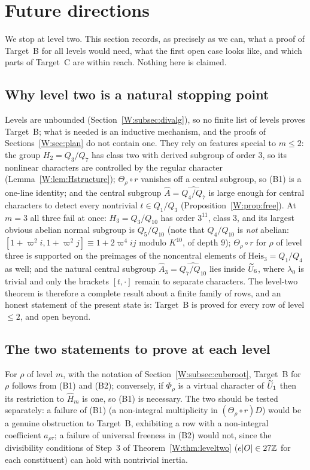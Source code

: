 \section{Future directions}\label{W:sec:future}
We stop at level two.  This section records, as precisely as we can,
what a proof of Target~B for all levels would need, what the first open
case looks like, and which parts of Target~C are within reach.  Nothing
here is claimed.

\subsection{Why level two is a natural stopping point}
Levels are unbounded (Section~\ref{W:subsec:divalg}), so no finite list of
levels proves Target~B; what is needed is an inductive mechanism, and the
proofs of Sections~\ref{W:sec:plan} do not contain one.  They rely on
features special to $m\le2$: the group $H_2=Q_3/Q_7$ has class two with
derived subgroup of order $3$, so its nonlinear characters are
controlled by the regular character (Lemma~\ref{W:lem:Hstructure});
$\Theta_\rho\circ r$ vanishes off a central subgroup, so (B1) is a
one-line identity; and the central subgroup $\hat A=\widehat{Q_4/Q_7}$
is large enough for central characters to detect every nontrivial
$t\in Q_1/Q_3$ (Proposition~\ref{W:prop:free}).  At $m=3$ all three fail
at once: $H_3=Q_3/Q_{10}$ has order $3^{11}$, class $3$, and its
largest obvious abelian normal subgroup is $Q_5/Q_{10}$ (note that
$Q_4/Q_{10}$ is \emph{not} abelian: $[1+\varpi^2i,1+\varpi^2j]\equiv1+2\varpi^4ij$
modulo $K^{10}$, of depth $9$); $\Theta_\rho\circ r$ for $\rho$ of level
three is supported on the preimages of the noncentral elements of
$\mathrm{Heis}_3=Q_1/Q_4$ as well; and the natural central subgroup
$\hat A_3=\widehat{Q_7/Q_{10}}$ lies inside $\widetilde U_6$, where
$\lambda_0$ is trivial and only the brackets $[t,\cdot]$ remain to
separate characters.  The level-two theorem is therefore a complete
result about a finite family of rows, and an honest statement of the
present state is: Target~B is proved for every row of level $\le2$,
and open beyond.

\subsection{The two statements to prove at each level}
For $\rho$ of level $m$, with the notation of
Section~\ref{W:subsec:cuberoot}, Target~B for $\rho$ follows from (B1)
and (B2); conversely, if $\Phi_\rho$ is a virtual character of $\widetilde U_1$
then its restriction to $\hat H_m$ is one, so (B1) is necessary.  The
two should be tested separately: a failure of (B1) (a non-integral
multiplicity in $(\Theta_\rho\circ r)D$) would be a genuine obstruction
to Target~B, exhibiting a row with a non-integral coefficient
$a_{\rho\tau}$; a failure of universal freeness in (B2) would not, since
the divisibility conditions of Step~3 of Theorem~\ref{W:thm:leveltwo}
($e|O|\in27\mathbb Z$ for each constituent) can hold with nontrivial inertia.

